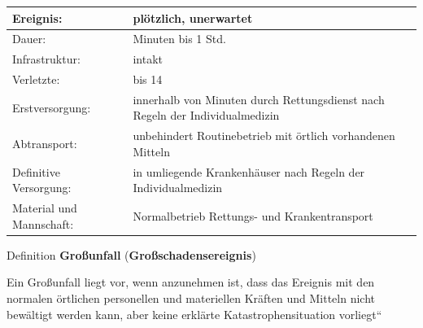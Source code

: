 \documentclass{article}
\newcommand\gT[1]{\textbf{\textup{\textcolor[rgb]{0.0,0.5019608,0.0}{#1}}}}
\newcommand\gNw[1]{#1}
\begin{document}
\begin{center}
\begin{tabular}{|m{3.31cm}|m{9.99cm}|}
\hline
{\mdseries Ereignis:}

 &
{\mdseries pl\"otzlich, unerwartet}

\\\hline
{\mdseries Dauer:}

 &
{\mdseries Minuten bis 1 Std.}

\\\hline
{\mdseries Infrastruktur:}

 &
{\mdseries intakt}

\\\hline
{\mdseries Verletzte:}

 &
{\mdseries bis 14}

\\\hline
{\mdseries Erstversorgung:}

 &
{\mdseries innerhalb von Minuten durch Rettungsdienst nach Regeln der
Individual\-medizin}

\\\hline
{\mdseries Abtransport:}

 &
{\mdseries unbehindert Routinebetrieb mit \"ortlich vorhandenen Mitteln}

\\\hline
{\mdseries Definitive Versorgung:}

 &
{\mdseries in umliegende Krankenh\"auser nach Regeln der
Individualmedizin}

\\\hline
{\mdseries Material und Mannschaft:}

 &
{\mdseries Normalbetrieb Rettungs- und Krankentransport}

\\\hline
\end{tabular}
\end{center}
{\mdseries\color{black}
Definition \gT{Gro{\ss}unfall}
(\gT{Gro{\ss}schadensereignis})}

{\mdseries
{\quotedblbase}Ein Gro{\ss}unfall liegt vor, wenn anzunehmen ist, dass
das Ereignis mit den \gNw{normalen} \"ortlichen personellen
und materiellen Kr\"aften und Mitteln nicht bew\"altigt werden kann,
aber keine erkl\"arte Katastrophensituation
vorliegt{\textquotedblleft}}
\end{document}
